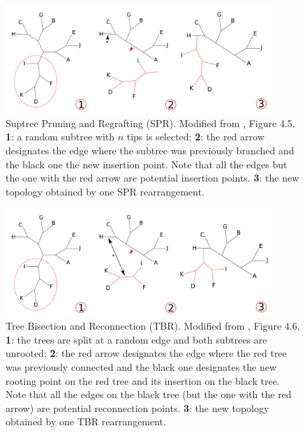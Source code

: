 \documentclass[12pt,letterpaper]{article}
\begin{document}
\begin{figure}[!htbp]
\centering
   \includegraphics[width=0.9\textwidth]{Figure/SPR.pdf}
\caption{Suptree Pruning and Regrafting (SPR). Modified from \cite{felsenstein2004inferring}, Figure 4.5. \textbf{1}: a random subtree with $n$ tips is selected; \textbf{2}: the red arrow designates the edge where the subtree was previously branched and the black one the new insertion point. Note that all the edges but the one with the red arrow are potential insertion points. \textbf{3}: the new topology obtained by one SPR rearrangement.}
\label{Figure_SPR}
\end{figure}

\begin{figure}[!htbp]
\centering
   \includegraphics[width=0.9\textwidth]{Figure/TBR.pdf}
\caption{Tree Bisection and Reconnection (TBR). Modified from \cite{felsenstein2004inferring}, Figure 4.6. \textbf{1}: the trees are split at a random edge and both subtrees are unrooted; \textbf{2}: the red arrow designates the edge where the red tree was previously connected and the black one designates the new rooting point on the red tree and its insertion on the black tree. Note that all the edges on the black tree (but the one with the red arrow) are potential reconnection points. \textbf{3}: the new topology obtained by one TBR rearrangement.}
\label{Figure_TBR}
\end{figure}
\end{document}
